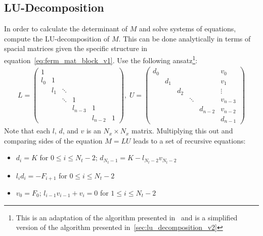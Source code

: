 \documentclass[a4paper, fleqn, twoside, notitlepage]{scrartcl}
\begin{document}
\subsection{LU-Decomposition}\label{sec:lu_v1}

In order to calculate the determinant of $M$ and solve systems of equations, compute the LU-decomposition of $M$. This can be done analytically in terms of spacial matrices given the specific structure in equation~\eqref{eq:ferm_mat_block_v1}.
Use the following ansatz\footnote{This is an adaptation of the algorithm presented in~\cite{zivkovic:2013} and is a simplified version of the algorithm presented in~\cref{sec:lu_decomposition_v2}}:
\begin{align}
  L =
  \begin{pmatrix}
    1   &     &    &        &        &\\
    l_0 & 1   &    &        &        &\\
        & l_1 & \ddots &        &        &\\
        &     & \ddots & 1      &        &\\
        &     &   & l_{n-3} & 1      &\\
        &     &   &        & l_{n-2} & 1
  \end{pmatrix},
  \; U =
  \begin{pmatrix}
    d_0 &     &      &   &        & v_0\\
        & d_1 &     &    &        & v_1\\
        &     & d_2 &    &        & \vdots \\
        &     &     & \ddots &        & v_{n-3} \\
        &     &     &    & d_{n-2} & v_{n-2} \\
        &     &     &    &        & d_{n-1}
  \end{pmatrix}
\end{align}
Note that each $l$, $d$, and $v$ is an $N_x \times N_x$ matrix. Multiplying this out and comparing sides of the equation $M = LU$ leads to a set of recursive equations:
\begin{itemize}
\item $d_i = K$ for $0 \le i \le N_t-2$;\hspace{2em} $d_{N_t-1} = K - l_{N_t-2}v_{N_t-2}$
\item $l_i d_i = -F_{i+1}$ for $0 \le i \le N_t-2$
\item $v_0 = F_0$;\hspace{2em} $l_{i-1} v_{i-1} + v_i = 0$ for $1 \le i \le N_t-2$
\end{itemize}
\end{document}
